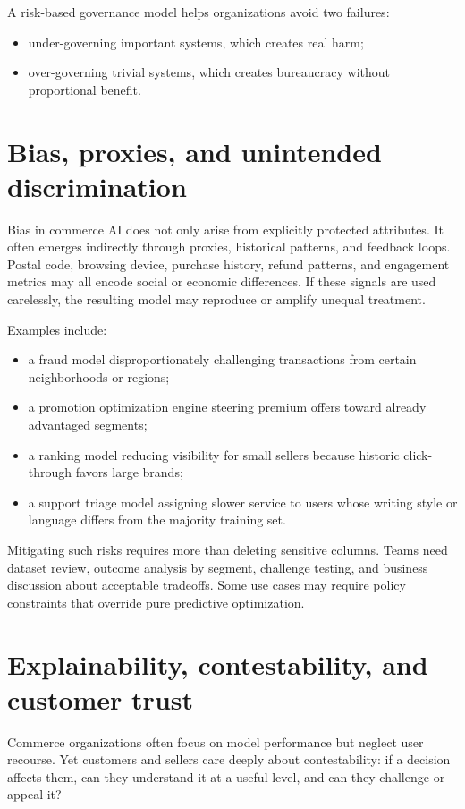 A risk-based governance model helps organizations avoid two failures:
\begin{itemize}
  \item under-governing important systems, which creates real harm;
  \item over-governing trivial systems, which creates bureaucracy without proportional benefit.
\end{itemize}

\section{Bias, proxies, and unintended discrimination}
Bias in commerce AI does not only arise from explicitly protected attributes. It often emerges indirectly through proxies, historical patterns, and feedback loops. Postal code, browsing device, purchase history, refund patterns, and engagement metrics may all encode social or economic differences. If these signals are used carelessly, the resulting model may reproduce or amplify unequal treatment.

Examples include:
\begin{itemize}
  \item a fraud model disproportionately challenging transactions from certain neighborhoods or regions;
  \item a promotion optimization engine steering premium offers toward already advantaged segments;
  \item a ranking model reducing visibility for small sellers because historic click-through favors large brands;
  \item a support triage model assigning slower service to users whose writing style or language differs from the majority training set.
\end{itemize}

Mitigating such risks requires more than deleting sensitive columns. Teams need dataset review, outcome analysis by segment, challenge testing, and business discussion about acceptable tradeoffs. Some use cases may require policy constraints that override pure predictive optimization.

\section{Explainability, contestability, and customer trust}
Commerce organizations often focus on model performance but neglect user recourse. Yet customers and sellers care deeply about contestability: if a decision affects them, can they understand it at a useful level, and can they challenge or appeal it?

